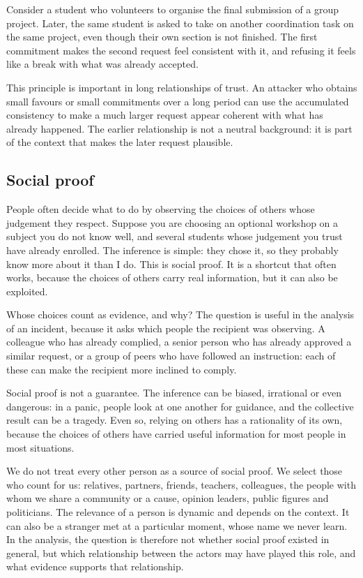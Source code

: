Consider a student who volunteers to organise the final submission of a group project. Later, the same student is asked to take on another coordination task on the same project, even though their own section is not finished. The first commitment makes the second request feel consistent with it, and refusing it feels like a break with what was already accepted.

This principle is important in long relationships of trust. An attacker who obtains small favours or small commitments over a long period can use the accumulated consistency to make a much larger request appear coherent with what has already happened. The earlier relationship is not a neutral background: it is part of the context that makes the later request plausible.

\subsection{Social proof}
People often decide what to do by observing the choices of others whose judgement they respect. Suppose you are choosing an optional workshop on a subject you do not know well, and several students whose judgement you trust have already enrolled. The inference is simple: they chose it, so they probably know more about it than I do. This is social proof. It is a shortcut that often works, because the choices of others carry real information, but it can also be exploited.

Whose choices count as evidence, and why? The question is useful in the analysis of an incident, because it asks which people the recipient was observing. A colleague who has already complied, a senior person who has already approved a similar request, or a group of peers who have followed an instruction: each of these can make the recipient more inclined to comply.

Social proof is not a guarantee. The inference can be biased, irrational or even dangerous: in a panic, people look at one another for guidance, and the collective result can be a tragedy. Even so, relying on others has a rationality of its own, because the choices of others have carried useful information for most people in most situations.

We do not treat every other person as a source of social proof. We select those who count for us: relatives, partners, friends, teachers, colleagues, the people with whom we share a community or a cause, opinion leaders, public figures and politicians. The relevance of a person is dynamic and depends on the context. It can also be a stranger met at a particular moment, whose name we never learn. In the analysis, the question is therefore not whether social proof existed in general, but which relationship between the actors may have played this role, and what evidence supports that relationship.


